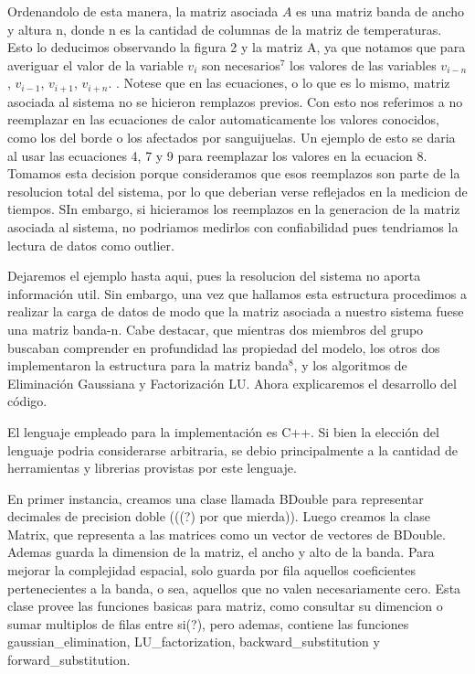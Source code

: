 Ordenandolo de esta manera, la matriz asociada $A$ es una matriz banda de ancho y altura n, donde n es la cantidad de columnas 
de la matriz de temperaturas. Esto lo deducimos observando la figura 2 y la matriz A,
ya que notamos que para averiguar el valor de la variable $v_{i}$ son necesarios$^7$ los valores de las variables $v_{i-n}$, $v_{i-1}$, 
$v_{i+1}$, $v_{i+n}$.
.
Notese que en las ecuaciones, o lo que es lo mismo, matriz asociada al sistema no se hicieron remplazos previos. Con esto nos referimos a no reemplazar
 en las ecuaciones de calor automaticamente los valores conocidos, como los del borde o los afectados por sanguijuelas. Un ejemplo de esto se daria 
 al usar las ecuaciones 4, 7 y 9 para reemplazar los valores en la ecuacion 8. Tomamos esta decision porque consideramos que esos reemplazos son parte
 de la resolucion total del sistema, por lo que deberian verse reflejados en la medicion de tiempos. SIn embargo, si hicieramos los reemplazos 
 en la generacion de la matriz asociada al sistema, no podriamos medirlos con confiabilidad pues tendriamos la lectura de datos como outlier.

Dejaremos el ejemplo hasta aqui, pues la resolucion del sistema no aporta informaci\'on util. Sin embargo, una vez que hallamos esta estructura 
procedimos a realizar la carga de datos de modo que la matriz asociada a nuestro sistema fuese una matriz banda-n. Cabe destacar, que mientras dos 
miembros del grupo buscaban comprender en profundidad las propiedad del modelo, los otros dos implementaron la estructura para la matriz banda$^8$,
y los algoritmos de Eliminaci\'on Gaussiana y Factorizaci\'on LU. Ahora explicaremos el desarrollo del c\'odigo.

El lenguaje empleado para la implementaci\'on es C++. Si bien la elecci\'on del lenguaje podria considerarse arbitraria, se debio principalmente a la 
cantidad de herramientas y librerias provistas por este lenguaje. 

En primer instancia, creamos una clase llamada BDouble para representar decimales de
precision doble (((?) por que mierda)). Luego creamos la clase Matrix, que representa a las matrices como un vector de vectores de BDouble. 
Ademas guarda la dimension de la matriz, el ancho y alto de la banda. Para mejorar la complejidad espacial, solo guarda por fila aquellos
coeficientes pertenecientes a la banda, o sea, aquellos que no valen necesariamente cero. Esta clase provee las funciones basicas para matriz, como 
consultar su dimencion o sumar multiplos de filas entre si(?), pero ademas, contiene las funciones gaussian\_elimination, LU\_factorization, backward\_substitution y 
forward\_substitution. 

